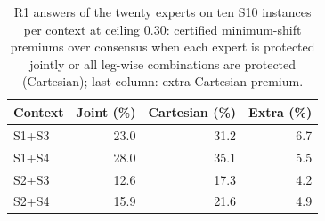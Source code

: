 \begin{table}[tb]
\centering
\caption{R1 answers of the twenty experts on ten S10 instances per context at ceiling 0.30: certified minimum-shift premiums over consensus when each expert is protected jointly or all leg-wise combinations are protected (Cartesian); last column: extra Cartesian premium.}
\label{tab:joint-v10}
\scriptsize\setlength{\tabcolsep}{3pt}
\begin{tabular}{@{}lrrr@{}}
\toprule
Context & Joint (\%) & Cartesian (\%) & Extra (\%)\\\midrule
S1+S3 & 23.0 & 31.2 & 6.7\\
S1+S4 & 28.0 & 35.1 & 5.5\\
S2+S3 & 12.6 & 17.3 & 4.2\\
S2+S4 & 15.9 & 21.6 & 4.9\\
\bottomrule
\end{tabular}
\end{table}
